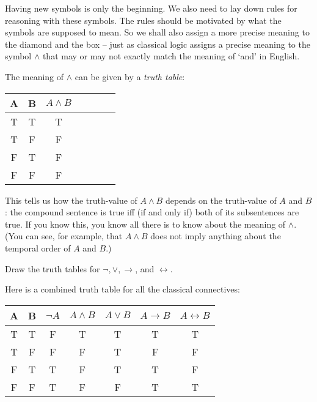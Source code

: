 
Having new symbols is only the beginning. We also need to lay down 
rules for reasoning with these symbols. The rules should be motivated by
what the symbols are supposed to mean. So we shall also assign a more precise
meaning to the diamond and the box -- just as classical logic assigns a precise
meaning to the symbol $\land$ that may or may not exactly match the meaning of
`and' in English.


The meaning of $\land$ can be given by a \emph{truth table}:
\begin{center}
  \begin{tabular}{cc|ccccc}
    A & B & $A \land B$ \\\hline
    T & T & T\\
    T & F & F\\
    F & T & F\\
    F & F & F
  \end{tabular}
\end{center}
This tells us how the truth-value of $A \land B$ depends on the truth-value of
$A$ and $B$: the compound sentence is true iff (if and only if) both of its
subsentences are true. If you know this, you know all there is to know about the
meaning of $\land$. (You can see, for example, that $A \land B$ does not imply
anything about the temporal order of $A$ and $B$.)

\begin{exercise}
  Draw the truth tables for $\neg, \lor, \to$, and $\leftrightarrow$.
\end{exercise}
\begin{solution}
  Here is a combined truth table for all the classical connectives: 
  \begin{center}
    \begin{tabular}{cc|ccccc}
      A & B & $\neg A$ & $A \land B$ & $A\lor B$ & $A\to B$ & $A\leftrightarrow B$\\\hline
      T & T & F & T & T & T & T\\
      T & F & F & F & T & F & F\\
      F & T & T & F & T & T & F\\
      F & F & T & F & F & T & T\\
    \end{tabular}
  \end{center}
\end{solution}



